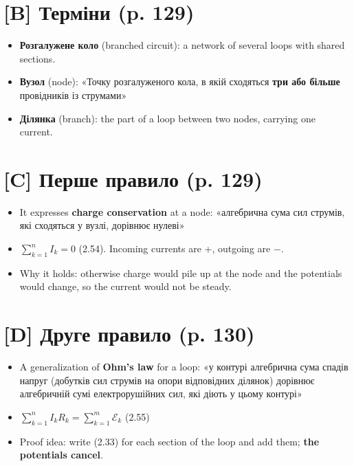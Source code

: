 \documentclass[11pt,a4paper,oneside]{book}
\begin{document}
\section*{[B] Терміни (p. 129)}
\begin{itemize}
\item \textbf{Розгалужене коло} (branched circuit): a network of several loops with shared sections.
\item \textbf{Вузол} (node): «Точку розгалуженого кола, в якій сходяться \textbf{три або більше} провідників із струмами»
\item \textbf{Ділянка} (branch): the part of a loop between two nodes, carrying one current.
\end{itemize}

\section*{[C] Перше правило (p. 129)}
\begin{itemize}
\item It expresses \textbf{charge conservation} at a node: «алгебрична сума сил струмів, які сходяться у вузлі, дорівнює нулеві»
\item $\sum_{k=1}^n I_k = 0$ (2.54). Incoming currents are +, outgoing are −.
\item Why it holds: otherwise charge would pile up at the node and the potentials would change, so the current would not be steady.
\end{itemize}

\section*{[D] Друге правило (p. 130)}
\begin{itemize}
\item A generalization of \textbf{Ohm's law} for a loop: «у контурі алгебрична сума спадів напруг (добутків сил струмів на опори відповідних ділянок) дорівнює алгебричній сумі електрорушійних сил, які діють у цьому контурі»
\item $\sum_{k=1}^n I_kR_k = \sum_{k=1}^m \mathcal E_k$ (2.55)
\item Proof idea: write (2.33) for each section of the loop and add them; \textbf{the potentials cancel}.
\end{itemize}
\end{document}
